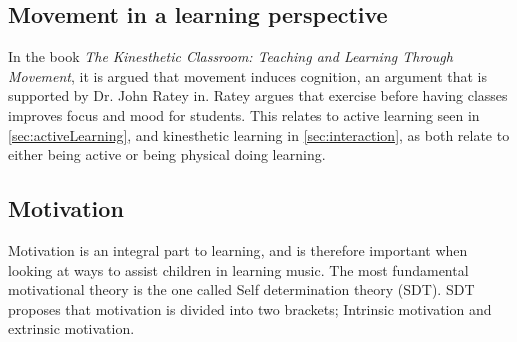 \subsection{Movement in a learning perspective} 
	In the book \textit{The Kinesthetic Classroom: Teaching and Learning Through Movement}\cite{kinestheticMovement}, it is argued that movement induces cognition, an argument that is supported by Dr. John Ratey in\cite{rateySpark}. Ratey argues that exercise before having classes improves focus and mood for students\cite[p.~33]{rateySpark}. This relates to active learning seen in \autoref{sec:activeLearning}, and kinesthetic learning in \autoref{sec:interaction}, as both relate to either being active or being physical doing learning.
\subsection{Motivation}
Motivation is an integral part to learning\cite{motivationGameDesign}, and is therefore important when looking at ways to assist children in learning music. The most fundamental motivational theory is the one called Self determination theory (SDT)\cite{SDT}. SDT proposes that motivation is divided into two brackets; Intrinsic motivation and extrinsic motivation\cite{SDT}. 

